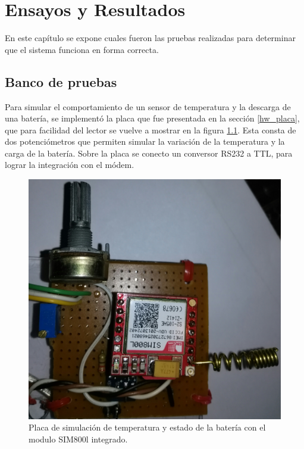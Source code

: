 \chapter{Ensayos y Resultados} %
En este capítulo se expone cuales fueron las pruebas realizadas para determinar que el sistema funciona en forma correcta.
\label{Chapter4} %

\section{Banco de pruebas}
Para simular el comportamiento de un sensor de temperatura y la descarga de una batería, se implementó la placa que fue presentada en la sección \ref{hw_placa}, que para facilidad del lector se vuelve a mostrar en la figura \ref{fig:placa_básica}. 
Esta consta de dos potenciómetros que permiten simular la variación de la temperatura y la carga de la batería. Sobre la placa se conecto un conversor RS232 a TTL, para lograr la integración con el módem.

\begin{figure}[h]
  \centering
  \includegraphics[scale=.1]{./Figures/placa_basica.jpg}
  \caption{Placa de simulación de temperatura y estado de la batería con el modulo SIM800l integrado.}
  \label{fig:placa_básica}
\end{figure}

